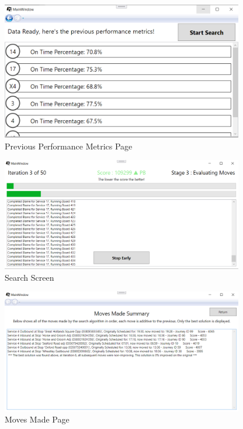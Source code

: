 \documentclass{article}
\begin{document}
\begin{figure}[H]
	\centering
	\includegraphics[width=400px]{images/performance.PNG}
	\caption{Previous Performance Metrics Page}
	\label{fig:performanceMetrics}
\end{figure}

\begin{figure}[H]
	\centering
	\includegraphics[width=400px]{images/searchScreen.PNG}
	\caption{Search Screen}
	\label{fig:searchScreen}
\end{figure}

\begin{figure}[H]
	\centering
	\includegraphics[width=400px]{images/movesmade.PNG}
	\caption{Moves Made Page}
	\label{fig:movesMade}
\end{figure}
\end{document}
